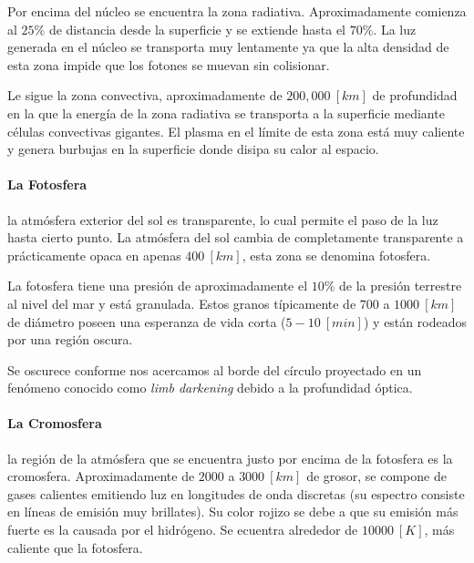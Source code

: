 \documentclass{tufte-handout}
\begin{document}
Por encima del núcleo se encuentra la zona radiativa. Aproximadamente comienza al $25\%$ de distancia desde la superficie y se extiende hasta el $70\%$. La luz generada en el núcleo se transporta muy lentamente ya que la alta densidad de esta zona impide que los fotones se muevan sin colisionar.

Le sigue la zona convectiva, aproximadamente de $200,000~[km]$ de profundidad en la que la energía de la zona radiativa se transporta a la superficie mediante células convectivas gigantes. El plasma en el límite de esta zona está muy caliente y genera burbujas en la superficie donde disipa su calor al espacio.

\paragraph{La Fotosfera} la atmósfera exterior del sol es transparente, lo cual permite el paso de la luz hasta cierto punto. La atmósfera del sol cambia de completamente transparente a prácticamente opaca en apenas $400~[km]$, esta zona se denomina fotosfera.

La fotosfera tiene una presión de aproximadamente el $10\%$ de la presión terrestre al nivel del mar y está granulada. Estos granos típicamente de $700$ a $1000~[km]$ de diámetro poseen una esperanza de vida corta ($5-10~[min]$) y están rodeados por una región oscura.

Se oscurece conforme nos acercamos al borde del círculo proyectado en un fenómeno conocido como \emph{limb darkening} debido a la profundidad óptica.

\paragraph{La Cromosfera} la región de la atmósfera que se encuentra justo por encima de la fotosfera es la cromosfera. Aproximadamente de $2000$ a $3000~[km]$ de grosor, se compone de gases calientes emitiendo luz en longitudes de onda discretas (su espectro consiste en líneas de emisión muy brillates). Su color rojizo se debe a que su emisión más fuerte es la causada por el hidrógeno. Se ecuentra alrededor de $10000~[K]$, más caliente que la fotosfera.
\end{document}
